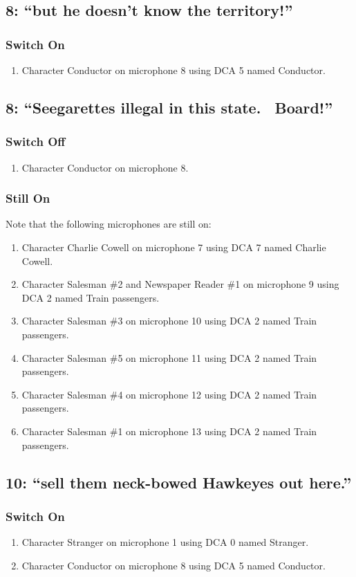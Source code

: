 \subsection* {8: ``but he doesn't know the territory!''}
\subsubsection* {Switch On}
\begin{enumerate}
\item Character Conductor on microphone 8 using DCA 5 named Conductor.
\end{enumerate}
\subsection* {8: ``Seegarettes illegal in this state.~ Board!''}
\subsubsection* {Switch Off}
\begin{enumerate}
\item Character Conductor on microphone 8.
\end{enumerate}
\subsubsection* {Still On}
Note that the following microphones are still on:
\begin{enumerate}
\item Character Charlie Cowell on microphone 7 using DCA 7 named Charlie Cowell.
\item Character Salesman \#2 and Newspaper Reader \#1 on microphone 9 using DCA 2 named Train passengers.
\item Character Salesman \#3 on microphone 10 using DCA 2 named Train passengers.
\item Character Salesman \#5 on microphone 11 using DCA 2 named Train passengers.
\item Character Salesman \#4 on microphone 12 using DCA 2 named Train passengers.
\item Character Salesman \#1 on microphone 13 using DCA 2 named Train passengers.
\end{enumerate}
\subsection* {10: ``sell them neck-bowed Hawkeyes out here.''}
\subsubsection* {Switch On}
\begin{enumerate}
\item Character Stranger on microphone 1 using DCA 0 named Stranger.
\item Character Conductor on microphone 8 using DCA 5 named Conductor.
\end{enumerate}
